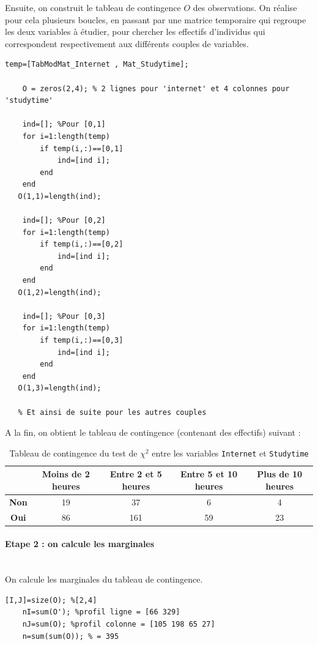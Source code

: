 \documentclass[11pt]{article}
\begin{document}
Ensuite, on construit le tableau de contingence $O$ des observations. On réalise pour cela plusieurs boucles, en passant par une matrice temporaire qui regroupe les deux variables à étudier, pour chercher les effectifs d'individus qui correspondent respectivement aux différents couples de variables.

\begin{lstlisting}[firstnumber=15,caption={Extrait des boucles permettant de construire le tableau de contingence du test du $\chi^2$}]
    temp=[TabModMat_Internet , Mat_Studytime];
    
    O = zeros(2,4); % 2 lignes pour 'internet' et 4 colonnes pour 'studytime'
    
    ind=[]; %Pour [0,1]
    for i=1:length(temp)
        if temp(i,:)==[0,1]
            ind=[ind i];
        end
    end
   O(1,1)=length(ind);
   
    ind=[]; %Pour [0,2]
    for i=1:length(temp)
        if temp(i,:)==[0,2]
            ind=[ind i];
        end
    end
   O(1,2)=length(ind);
   
    ind=[]; %Pour [0,3]
    for i=1:length(temp)
        if temp(i,:)==[0,3]
            ind=[ind i];
        end
    end
   O(1,3)=length(ind);
   
   % Et ainsi de suite pour les autres couples
\end{lstlisting}

A la fin, on obtient le tableau de contingence (contenant des effectifs) suivant :

\begin{table}[h] \centering \caption{Tableau de contingence du test de $\chi^2$ entre les variables \texttt{Internet} et \texttt{Studytime}}
\begin{tabular}{|c|c|c|c|c|}
  \hline
 	\backslashbox{\textbf{\emph{Internet}}}{\textbf{\emph{Studytime}}}& \textbf{Moins de 2 heures} & \textbf{Entre 2 et 5 heures} & \textbf{Entre 5 et 10 heures} & \textbf{Plus de 10 heures}\\
  \hline
          
          \textbf{Non} & 19 & 37 & 6 & 4\\\hline
          \textbf{Oui} & 86 & 161 & 59 & 23 \\\hline
          \end{tabular}
\end{table}

\paragraph{Etape 2 : on calcule les marginales}~\\\indent
On calcule les marginales du tableau de contingence.
\begin{lstlisting}[firstnumber = 86, caption={Calcul des marginales du tableau de contingence pour le test du $\chi^2$}]
    [I,J]=size(O); %[2,4]
    nI=sum(O'); %profil ligne = [66 329]
    nJ=sum(O); %profil colonne = [105 198 65 27]
    n=sum(sum(O)); % = 395
 \end{lstlisting}
 
\end{document}
